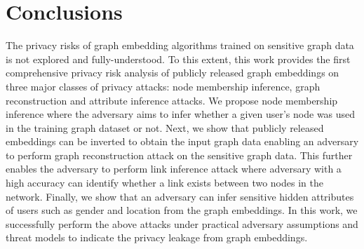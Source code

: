 \section{Conclusions}\label{conclusions}


The privacy risks of graph embedding algorithms trained on sensitive graph data is not explored and fully-understood.
To this extent, this work provides the first comprehensive privacy risk analysis of publicly released graph embeddings on three major classes of privacy attacks: node membership inference, graph reconstruction and attribute inference attacks.
We propose node membership inference where the adversary aims to infer whether a given user's node was used in the training graph dataset or not.
Next, we show that publicly released embeddings can be inverted to obtain the input graph data enabling an adversary to perform graph reconstruction attack on the sensitive graph data.
This further enables the adversary to perform link inference attack where adversary with a high accuracy can identify whether a link exists between two nodes in the network.
Finally, we show that an adversary can infer sensitive hidden attributes of users such as gender and location from the graph embeddings.
In this work, we successfully perform the above attacks under practical adversary assumptions and threat models to indicate the privacy leakage from graph embeddings.
